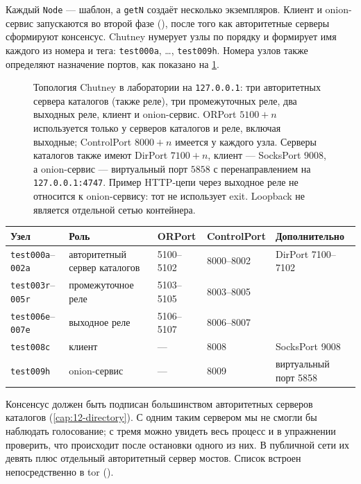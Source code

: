 Каждый \texttt{Node} — шаблон, а \texttt{getN} создаёт несколько экземпляров. Клиент и onion-сервис запускаются во второй фазе (), после того как авторитетные серверы сформируют консенсус. Chutney нумерует узлы по порядку и формирует имя каждого из номера и тега: \texttt{test000a}, \ldots, \texttt{test009h}. Номера узлов также определяют назначение портов, как показано на \cref{fig:rete-privata}.

\begin{figure}[htbp]
\centering

\caption{Топология Chutney в лаборатории на \texttt{127.0.0.1}: три авторитетных сервера каталогов (также реле), три промежуточных реле, два выходных реле, клиент и onion-сервис. ORPort $5100+n$ используется только у серверов каталогов и реле, включая выходные; ControlPort $8000+n$ имеется у каждого узла. Серверы каталогов также имеют DirPort $7100+n$, клиент — SocksPort $9008$, а onion-сервис — виртуальный порт $5858$ с перенаправлением на \texttt{127.0.0.1:4747}. Пример HTTP-цепи через выходное реле не относится к onion-сервису: тот не использует exit. Loopback не является отдельной сетью контейнера.}
\label{fig:rete-privata}
\end{figure}

\begin{center}\small
\setlength{\tabcolsep}{3.5pt}
\begin{tabular}{lllll}
\toprule
Узел & Роль & ORPort & ControlPort & Дополнительно \\
\midrule
\texttt{test000a}--\texttt{002a} & авторитетный сервер каталогов & 5100--5102 & 8000--8002 & DirPort 7100--7102 \\
\texttt{test003r}--\texttt{005r} & промежуточное реле & 5103--5105 & 8003--8005 & \\
\texttt{test006e}--\texttt{007e} & выходное реле & 5106--5107 & 8006--8007 & \\
\texttt{test008c} & клиент & --- & 8008 & SocksPort 9008 \\
\texttt{test009h} & onion-сервис & --- & 8009 & виртуальный порт 5858 \\
\bottomrule
\end{tabular}
\end{center}

\begin{approfondimento}
Консенсус должен быть подписан большинством авторитетных серверов каталогов (\cref{cap:12-directory}). С одним таким сервером мы не смогли бы наблюдать голосование; с тремя можно увидеть весь процесс и в упражнении проверить, что происходит после остановки одного из них. В публичной сети их девять плюс отдельный авторитетный сервер мостов. Список встроен непосредственно в tor ().
\end{approfondimento}

